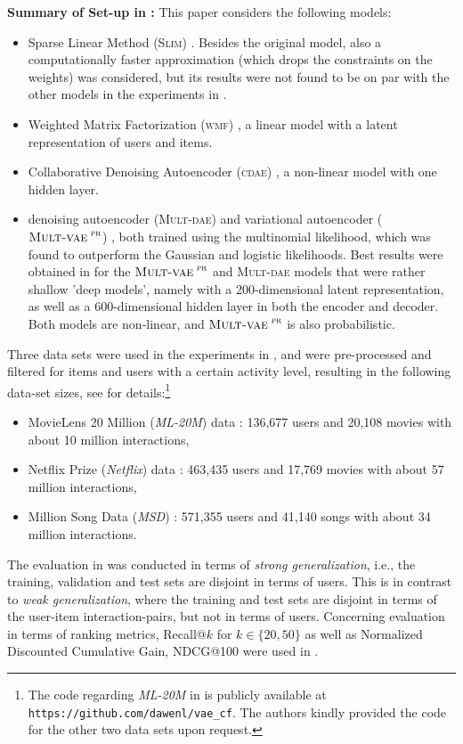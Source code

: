 \documentclass[sigconf]{acmart}
\newcommand{\slim}{{\scshape Slim}}
\newcommand{\wmf}{{\scshape wmf}}
\newcommand{\cdae}{{\scshape cdae}}
\newcommand{\mvae}{${\textsc{Mult-vae}}^{\textsc{ pr}}$}
\newcommand{\mdae}{{\scshape Mult-dae}}
\begin{document}
{\bf Summary of  Set-up in \cite{liang18}:} 
This paper considers the following models:
\begin{itemize}

\item Sparse Linear Method  (\slim{}) \cite{ning11}. Besides the original model, also a   computationally faster approximation  (which drops the constraints on the weights) \cite{levy13} was considered, but its results were not  found  to be on par with the other models in the experiments in \cite{liang18}.

\item Weighted Matrix Factorization (\wmf) \cite{hu08,pan08}, a linear model with a latent representation of users and items.

\item Collaborative Denoising Autoencoder (\cdae) \cite{wu16}, a non-linear model with one hidden layer.

\item denoising autoencoder (\mdae) and variational autoencoder (\mvae) \cite{liang18}, both trained using the multinomial likelihood, which was found to outperform the Gaussian and logistic likelihoods. Best results were obtained in \cite{liang18} for the \mvae{}  and \mdae{} models that were rather shallow 'deep models', namely with a 200-dimensional latent representation, as well as a 600-dimensional hidden layer in both the encoder and decoder. Both models are non-linear, and \mvae{}  is also probabilistic.

\end{itemize}
Three data sets were used in the experiments in \cite{liang18}, and were pre-processed and filtered for items and users with a certain activity level, resulting in the following data-set sizes, see \cite{liang18} for details:\footnote{The code regarding  \emph{ML-20M} in \cite{liang18} is publicly available at {\tt https://github.com/dawenl/vae\_cf}. The authors kindly provided the code for the other two  data sets upon request.}
\begin{itemize}
\item MovieLens 20 Million (\emph{ML-20M}) data \cite{movielens20mio}: 136,677 users and 20,108 movies with about 10 million interactions,
\item Netflix Prize (\emph{Netflix}) data \cite{netflixdata}: 463,435 users and 17,769 movies with about 57 million interactions,
\item Million Song Data (\emph{MSD}) \cite{msddata}: 571,355 users and 41,140 songs with about 34 million interactions.
\end{itemize}
The evaluation in \cite{liang18} was conducted in terms of \emph{strong generalization}, i.e., the training, validation and test sets are disjoint in terms of users. This is in contrast to \emph{weak generalization}, where the training and test sets are disjoint in terms of the user-item interaction-pairs, but not in terms of users. Concerning  evaluation in terms of ranking metrics, Recall@$k$ for $k\in\{20,50\}$ as well as Normalized Discounted Cumulative Gain, NDCG@100 were used  in \cite{liang18}.
\end{document}
